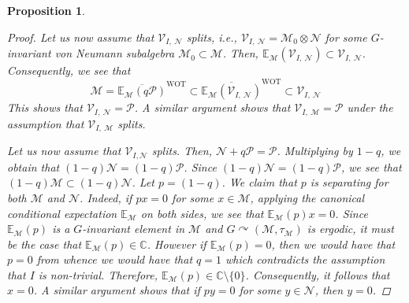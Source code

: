 \documentclass[12pt]{amsart}
\newtheorem{proposition}[thm]{Proposition}
\theoremstyle{definition}
\begin{document}
\begin{proposition}
\begin{proof}
Let us now assume that $\mathcal{V}_{I,~\mathcal{N}}$ splits, i.e., $\mathcal{V}_{I,~\mathcal{N}}=\mathcal{M}_0\otimes\mathcal{N}$ for some $G$-invariant von Neumann subalgebra $\mathcal{M}_0\subset\mathcal{M}$. Then, $\mathbb{E}_{\mathcal{M}}(\mathcal{V}_{I,~\mathcal{N}})\subset\mathcal{V}_{I,~\mathcal{N}}$. Consequently, we see that
\[\mathcal{M}=\overline{\mathbb{E}_{\mathcal{M}}(q\mathcal{P})}^{\text{WOT}}\subset\overline{\mathbb{E}_{\mathcal{M}}(\mathcal{V}_{I,~\mathcal{N}})}^{\text{WOT}}\subset\mathcal{V}_{I,~\mathcal{N}}\]
This shows that $\mathcal{V}_{I,~\mathcal{N}}=\mathcal{P}$. A similar argument shows that $\mathcal{V}_{I,~\mathcal{M}}=\mathcal{P}$ under the assumption that $\mathcal{V}_{I,~\mathcal{M}}$ splits. 

Let us now assume that $\mathcal{V}_{I,\mathcal{N}}$ splits. Then, $\mathcal{N}+q\mathcal{P}=\mathcal{P}$. Multiplying by $1-q$, we obtain that $(1-q)\mathcal{N}=(1-q)\mathcal{P}$. Since $(1-q)\mathcal{N}=(1-q)\mathcal{P}$, we see that $(1-q)\mathcal{M}\subset(1-q)\mathcal{N}$. Let $p=(1-q)$. We claim that $p$ is separating for both $\mathcal{M}$ and $\mathcal{N}$. Indeed, if $px=0$ for some $x\in\mathcal{M}$, applying the canonical conditional expectation $\mathbb{E}_{\mathcal{M}}$ on both sides, we see that $\mathbb{E}_{\mathcal{M}}(p)x=0$. Since $\mathbb{E}_{\mathcal{M}}(p)$ is a $G$-invariant element in $\mathcal{M}$ and $G\curvearrowright (\mathcal{M},\tau_{\mathcal{M}})$ is ergodic, it must be the case that $\mathbb{E}_{\mathcal{M}}(p)\in\mathbb{C}$. However if $\mathbb{E}_{\mathcal{M}}(p)=0$, then we would have that $p=0$ from whence we would have that $q=1$ which contradicts the assumption that $I$ is non-trivial. Therefore, $\mathbb{E}_{\mathcal{M}}(p)\in\mathbb{C}\setminus\{0\}$. Consequently, it follows that $x=0$. A similar argument shows that if $py=0$ for some $y\in\mathcal{N}$, then $y=0$.



\end{proof}
\end{proposition}
\end{document}
